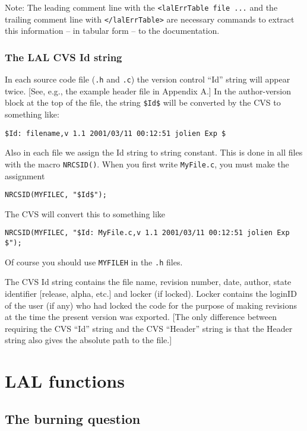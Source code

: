 \documentclass[]{ligodcc}
\begin{document}
Note: The leading comment line with the {\tt <lalErrTable file ...}
and the trailing comment line with {\tt </lalErrTable>} are necessary
commands to extract this information -- in tabular form -- to the
documentation.

\subsubsection{The LAL CVS Id string}

In each source code file ({\tt .h} and  {\tt .c}) the version control ``Id''
string will appear  twice.  [See, e.g., the example header file in
Appendix A.] In the author-version block at the top of the file, the
string {\tt \$\relax Id\$} will be converted 
by the CVS to something like:

\noindent
{\tt \$\relax Id: filename,v 1.1 2001/03/11 00:12:51 jolien Exp \$}

\noindent
Also in each file we assign the Id string to string constant. This is
done in all files with the macro 
{\tt NRCSID()}.  When you first write {\tt MyFile.c},  you must make the assignment  

\noindent
{\tt NRCSID(MYFILEC, "\$\relax Id\$");} 

\noindent
The CVS will convert this to something like

\noindent
{\tt NRCSID(MYFILEC, "\$\relax Id: MyFile.c,v 1.1 2001/03/11 00:12:51 jolien Exp \$");}

\noindent
Of course you should use {\tt MYFILEH} in the {\tt .h} files.

The  CVS Id  string contains the  file name, revision number, date,
author, state identifier [release, alpha, etc.] and locker (if
locked). Locker contains the loginID of the user (if any) who had
locked the code for the purpose of making revisions at the time the
present version was exported. [The only difference between requiring
the CVS  ``Id'' string and the CVS ``Header'' string is that the Header
string also gives the absolute path to the file.]

\section{LAL functions}
\label{sec:lalfunctions}
\subsection{The burning question}
\end{document}
